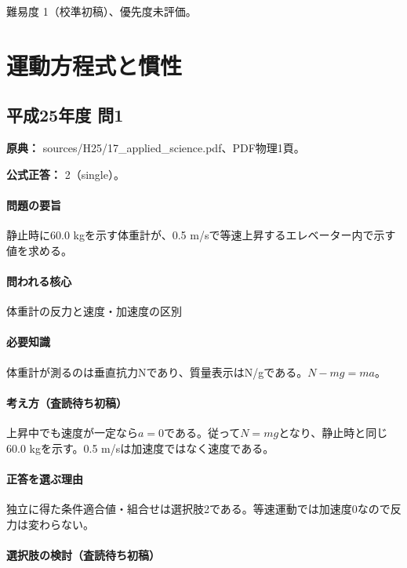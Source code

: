 \par 難易度 1（校準初稿）、優先度未評価。

\section{運動方程式と慣性}

\subsection{平成25年度 問1}
\label{q:h25-reg-applied-01}

\noindent\textbf{原典：} sources/H25/17\_applied\_science.pdf、PDF物理1頁。

\textbf{公式正答：} 2（single）。

\paragraph{問題の要旨} 静止時に60.0 kgを示す体重計が、0.5 m/sで等速上昇するエレベーター内で示す値を求める。

\paragraph{問われる核心} 体重計の反力と速度・加速度の区別

\paragraph{必要知識} 体重計が測るのは垂直抗力Nであり、質量表示はN/gである。\(N-mg=ma\)。

\paragraph{考え方（査読待ち初稿）} 上昇中でも速度が一定なら\(a=0\)である。従って\(N=mg\)となり、静止時と同じ60.0 kgを示す。0.5 m/sは加速度ではなく速度である。

\paragraph{正答を選ぶ理由} 独立に得た条件適合値・組合せは選択肢2である。等速運動では加速度0なので反力は変わらない。

\paragraph{選択肢の検討（査読待ち初稿）}\mbox{}\par

